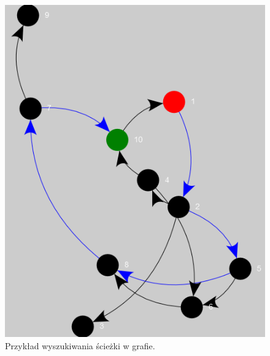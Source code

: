 \begin{figure}[!h]
	\centering
	\includegraphics{img/planowanie.png}
	\caption{Przykład wyszukiwania ścieżki w grafie.}
	\label{fig:planowanie}
\end{figure}